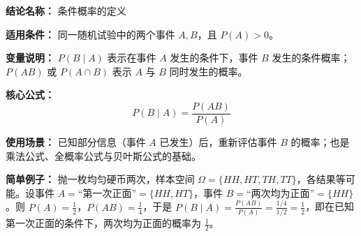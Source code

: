 \textbf{结论名称：} 条件概率的定义

\textbf{适用条件：} 同一随机试验中的两个事件 \(A, B\)，且 \(P(A)>0\)。

\textbf{变量说明：} \(P(B \mid A)\) 表示在事件 \(A\) 发生的条件下，事件 \(B\) 发生的条件概率；\(P(AB)\) 或 \(P(A \cap B)\) 表示 \(A\) 与 \(B\) 同时发生的概率。

\textbf{核心公式：} 
\[
\boxed{P(B \mid A) = \frac{P(AB)}{P(A)}}
\]

\textbf{使用场景：} 已知部分信息（事件 \(A\) 已发生）后，重新评估事件 \(B\) 的概率；也是乘法公式、全概率公式与贝叶斯公式的基础。

\textbf{简单例子：} 抛一枚均匀硬币两次，样本空间 \(\Omega=\{HH,HT,TH,TT\}\)，各结果等可能。设事件 \(A=\)“第一次正面”\(=\{HH,HT\}\)，事件 \(B=\)“两次均为正面”\(=\{HH\}\)。则 \(P(A)=\frac{1}{2}\)，\(P(AB)=\frac{1}{4}\)，于是 \(P(B \mid A) = \frac{P(AB)}{P(A)}=\frac{1/4}{1/2}=\frac{1}{2}\)，即在已知第一次正面的条件下，两次均为正面的概率为 \(\frac{1}{2}\)。